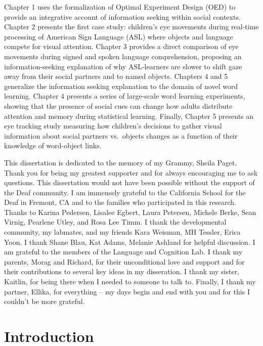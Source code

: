 \documentclass[oneside]{report}
\begin{document}
Chapter 1 uses the formalization of Optimal Experiment Design (OED) to
provide an integrative account of information seeking within social
contexts. Chapter 2 presents the first case study: children's eye
movements during real-time processing of American Sign Language (ASL)
where objects and language compete for visual attention. Chapter 3
provides a direct comparison of eye movements during signed and spoken
language comprehension, proposing an information-seeking explanation of
why ASL-learners are slower to shift gaze away from their social
partners and to named objects. Chapters 4 and 5 generalize the
information seeking explanation to the domain of novel word learning.
Chapter 4 presents a series of large-scale word learning experiments,
showing that the presence of social cues can change how adults
distribute attention and memory during statistical learning. Finally,
Chapter 5 presents an eye tracking study measuring how children's
decisions to gather visual information about social partners vs.~objects
changes as a function of their knowledge of word-object links.

This dissertation is dedicated to the memory of my Grammy, Sheila Paget.
Thank you for being my greatest supporter and for always encouraging me
to ask questions.
This dissertation would not have been possible without the support of
the Deaf community. I am immensely grateful to the California School for
the Deaf in Fremont, CA and to the families who participated in this
research. Thanks to Karina Pedersen, Lisalee Egbert, Laura Petersen,
Michele Berke, Sean Virnig, Pearlene Utley, and Rosa Lee Timm. I thank
the developmental community, my labmates, and my friends Kara Weisman,
MH Tessler, Erica Yoon. I thank Shane Blau, Kat Adams, Melanie Ashland
for helpful discussion. I am grateful to the members of the Language and
Cognition Lab. I thank my parents, Morag and Richard, for their
unconditional love and support and for their contributions to several
key ideas in my disseration. I thank my sister, Kaitlin, for being there
when I needed to someone to talk to. Finally, I thank my partner,
Ellika, for everything -- my days begin and end with you and for this I
couldn't be more grateful.

\afterpreface


\hypertarget{intro}{%
\chapter*{Introduction}\label{intro}}
\end{document}
